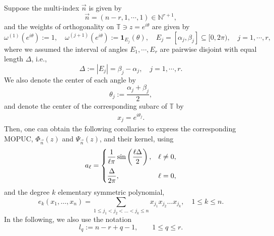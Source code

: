 \documentclass[a4paper,10pt,leqno]{amsart}
\numberwithin{equation}{section}
\theoremstyle{remark}
\newcommand{\N}{\mathbb{N}}
\begin{document}
Suppose the multi-index $\vec{n}$ is given by
\begin{equation} \label{multi-index MOPUC eg 1}
\vec{n} = (n-r, 1, \cdots, 1) \in \N^{r+1},
\end{equation}
and the weights of orthogonality on $\mathbb T \ni z = e^{i \theta}$ are given by
\begin{equation} \label{weights MOPUC eg 1}
\omega^{(1)}(e^{i\theta}) := 1,\quad
\omega^{(j+1)}(e^{i\theta}) := \mathbf{1}_{E_j}(\theta),\quad
E_j=[\alpha_j,\beta_j] \subseteq [0, 2\pi), \quad j=1,\cdots,r,
\end{equation}
where we assumed the interval of angles $E_1, \cdots, E_r$ are pairwise disjoint with equal length $\Delta$, i.e., 
\[
\Delta := |E_j| = \beta_j - \alpha_j, \quad j = 1, \cdots, r.
\]
We also denote the center of each angle by 
\[
\theta_j := \frac{\alpha_j + \beta_j}{2},
\]
and denote the center of the corresponding subarc of $\mathbb T$ by 
\begin{align} \label{defn of x_j}
x_j = e^{i \theta_j}.
\end{align}
Then, one can obtain the following corollaries to express the corresponding MOPUC, $\Phi_{\vec{n}}(z)$ and $\Psi_{\vec{n}}(z)$, and their kernel, using 
\begin{align}\label{defn of a_l}
a_\ell = \begin{dcases}
\frac{1}{\ell \pi} \sin \left( \frac{\ell \Delta}{2} \right), & \ell \neq 0,\\
\frac{\Delta}{2 \pi}, & \ell = 0,
\end{dcases}
\end{align}
and the degree $k$ elementary symmetric polynomial,
\begin{equation}\label{defn of esp}
e_k(x_1, \dots, x_n) = \sum_{1 \leq j_1 < j_2 < \dots < j_k \leq n} x_{j_1} x_{j_2} \dots x_{j_k}, \quad 1 \leq k \leq n.
\end{equation}
In the following, we also use the notation 
\begin{equation}\label{eq: lq}
l_q := n-r+q-1,    \qquad 1\leq q \leq r. 
\end{equation} 
\end{document}
